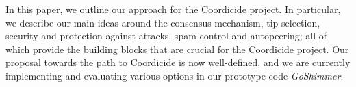 \documentclass[../main.tex]{subfiles}
\begin{document}
In this paper, we outline our approach for the Coordicide project. In particular, we describe our main ideas around the consensus mechanism, tip selection, security and protection against attacks, spam control and autopeering; all of which provide the building blocks that are crucial for the Coordicide project. Our proposal towards the path to Coordicide is now well-defined, and we are currently implementing and evaluating various options in our prototype code \emph{GoShimmer}. 

\begin{comment}
    

\begin{itemize}
    \item CLIRI is the most engineering-focused part of the Coordicide, and is centered on solving practical issues in converting the IRI codebase to a decentralized implementation.
    As CLIRI matures, it will serve as the platform for integrating all of the different Coordicide components together.
    
    \item By adding secured metadata to the communication layer it becomes possible to link transactions to their issuing node.
    Together with global node IDs as well as the proposed token-based Sybil protection, this offers a secure foundation for the other approaches described in the paper.
    
    \item We propose a hybrid rate control algorithm achieving a reasonable compromise: slow nodes or users with low \textit{mana} can issue (a few) transactions at inexpensive prices, while at the same time faster users cannot spam the network due to a limitation on burst of transactions.

    \item We propose a secure and robust autopeering protocol, which uses the concept of private and public salt to allow network reorganization and protect the network against Eclipse attacks.
    
    \item The tip selection strategy has been a crucial component since the inception of IOTA.
    It continues to be of great importance when making the network more resilient against attacks and improving conflict resolution.
    
    \item Finally, we propose two approaches to extend the previous consensus layer.
    By retrieving opinions about conflicts from others directly, nodes get enabled to resolve conflicts pro-actively.
\end{itemize}

\end{comment}
\end{document}
